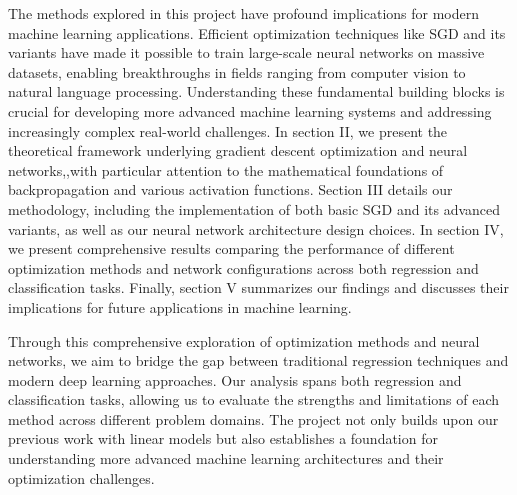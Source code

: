 The methods explored in this project have profound implications for modern machine learning applications. Efficient optimization techniques like SGD and its variants have made it possible to train large-scale neural networks on massive datasets, enabling breakthroughs in fields ranging from computer vision to natural language processing. Understanding these fundamental building blocks is crucial for developing more advanced machine learning systems and addressing increasingly complex real-world challenges. In section II, we present the theoretical framework underlying gradient descent optimization and neural networks,,with particular attention to the mathematical foundations of backpropagation and various activation functions. Section III details our methodology, including the implementation of both basic SGD and its advanced variants, as well as our neural network architecture design choices. In section IV, we present comprehensive results comparing the performance of different optimization methods and network configurations across both regression and classification tasks. Finally, section V summarizes our findings and discusses their implications for future applications in machine learning.

Through this comprehensive exploration of optimization methods and neural networks, we aim to bridge the gap between traditional regression techniques and modern deep learning approaches. Our analysis spans both regression and classification tasks, allowing us to evaluate the strengths and limitations of each method across different problem domains. The project not only builds upon our previous work with linear models but also establishes a foundation for understanding more advanced machine learning architectures and their optimization challenges.